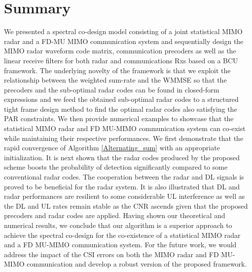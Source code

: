 \documentclass[9pt,journal]{IEEEtran}
\begin{document}
\section{Summary}
\label{sec:conclusion}
We presented a spectral co-design model consisting of a joint statistical MIMO radar and a FD-MU MIMO communication system and sequentially design the MIMO radar waveform code matrix, communication precoders as well as the linear receive filters for both radar and communications Rxs based on a BCU framework. The underlying novelty of the framework is that we exploit the relationship between the weighted sum-rate and the WMMSE so that the precoders and the sub-optimal radar codes can be found in closed-form expressions and we feed the obtained sub-optimal radar codes to a structured tight frame design method to find the optimal radar codes also satisfying the PAR constraints.  We then provide numerical examples to showcase that the statistical MIMO radar and FD MU-MIMO communication system can co-exist while maintaining their respective performances. We first demonstrate that the rapid convergence of Algorithm \ref{Alternating_sum} with an appropriate initialization. It is next shown that the radar codes produced by the proposed scheme boosts the probability of detection significantly compared to some conventional radar codes. The cooperation between the radar and DL signals is proved to be beneficial for the radar system. It is also illustrated that DL and radar performances are resilient to some considerable UL interference as well as the DL and UL rates remain stable as the CNR ascends given that the proposed precoders and radar codes are applied. Having shown our theoretical and numerical results, we conclude that our algorithm is a superior approach to achieve the spectral co-design for the co-existence of a statistical MIMO radar and a FD MU-MIMO communication system. For the future work, we would address the impact of the CSI errors on both the MIMO radar and FD MU-MIMO communication and develop a robust version of the proposed framework.
\end{document}
